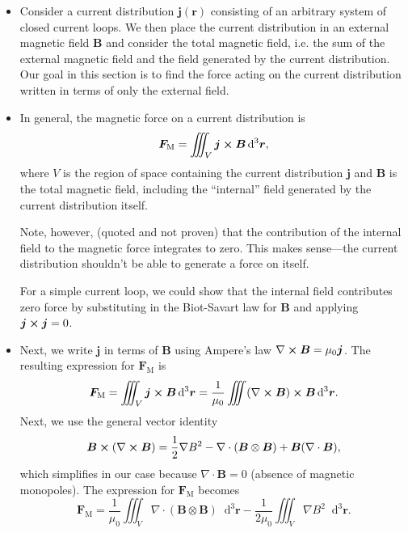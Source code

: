 \documentclass[11pt, a4paper]{article}
\newcommand{\diff}{\mathop{}\!\mathrm{d}} %
\newcommand{\dr}{\diff^{3} \r}  %
\renewcommand{\vec}[1]{\bm{#1}} %
\renewcommand{\r}{\vec{r}}
\newcommand{\B}{\vec{B}} %
\newcommand{\mm}{\mu_{0}}  %
\renewcommand{\j}{\vec{j}}  %
\renewcommand{\div}{\nabla \cdot}
\renewcommand{\curl}{\nabla \cross}
\renewcommand{\grad}{\nabla}
\begin{document}
\begin{itemize}
	\item Consider a current distribution $ \j(\r) $ consisting of an arbitrary system of closed current loops. We then place the current distribution in an external magnetic field $ \B $ and consider the total magnetic field, i.e. the sum of the external magnetic field and the field generated by the current distribution. Our goal in this section is to find the force acting on the current distribution written in terms of only the external field. 
	
	\item In general, the magnetic force on a current distribution is
	\begin{equation*}
		\vec{F}_{\text{M}} = \iiint_{V}\j \cross \B \dr,
	\end{equation*}
	where $ V $ is the region of space containing the current distribution $ \j $ and $ \B $ is the total magnetic field, including the ``internal'' field generated by the current distribution itself. 

    Note, however, (quoted and not proven) that the contribution of the internal field to the magnetic force integrates to zero. This makes sense---the current distribution shouldn't be able to generate a force on itself. 

    For a simple current loop, we could show that the internal field contributes zero force by substituting in the Biot-Savart law for $ \B $ and applying $ \j \cross \j = 0 $. 
	
    \item Next, we write $ \j $ in terms of $ \B $ using Ampere's law $ \curl \B = \mm \j $. The resulting expression for $ \vec{F}_{\text{M}} $ is
	\begin{equation*}
		\vec{F}_{\text{M}} = \iiint_{V}\j \cross \B \dr = \frac{1}{\mm}\iiint (\curl \B) \cross \B \dr.
	\end{equation*}
	Next, we use the general vector identity
	\begin{equation*}
		\B \cross (\curl \B) = \frac{1}{2}\grad B^{2} - \div (\B \otimes \B) + \B(\div \B),
	\end{equation*}
	which simplifies in our case because $ \div \B = 0 $ (absence of magnetic monopoles). The expression for $ \vec{F}_{\text{M}} $ becomes
	\begin{equation*}
		\vec{F}_{\text{M}} = \frac{1}{\mm}\iiint_{V} \div (\B \otimes \B)\dr - \frac{1}{2\mm}\iiint_{V} \grad B^{2}\dr.
	\end{equation*}
	

\end{itemize}
\end{document}
